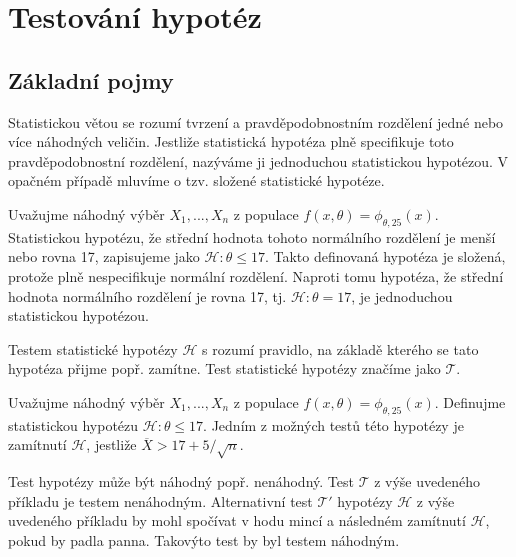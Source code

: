 \chapter{Testování hypotéz}

\section{Základní pojmy}

\begin{definition}
Statistickou větou se rozumí tvrzení a pravděpodobnostním rozdělení jedné nebo více náhodných veličin. Jestliže statistická hypotéza plně specifikuje toto pravděpodobnostní rozdělení, nazýváme ji jednoduchou statistickou hypotézou. V opačném případě mluvíme o tzv. složené statistické hypotéze.
\end{definition}

\begin{example}
Uvažujme náhodný výběr $X_1, ..., X_n$ z populace $f(x, \theta) = \phi_{\theta, 25}(x)$. Statistickou hypotézu, že střední hodnota tohoto normálního rozdělení je menší nebo rovna 17, zapisujeme jako $\mathscr{H}: \theta \le 17$. Takto definovaná hypotéza je složená, protože plně nespecifikuje normální rozdělení. Naproti tomu hypotéza, že střední hodnota normálního rozdělení je rovna 17, tj. $\mathscr{H}: \theta = 17$, je jednoduchou statistickou hypotézou.
\end{example}

\begin{definition}
Testem statistické hypotézy $\mathscr{H}$ s rozumí pravidlo, na základě kterého se tato hypotéza přijme popř. zamítne. Test statistické hypotézy značíme jako $\mathscr{T}$.
\end{definition}

\begin{example}
Uvažujme náhodný výběr $X_1, ..., X_n$ z populace $f(x, \theta) = \phi_{\theta, 25}(x)$. Definujme statistickou hypotézu $\mathscr{H}: \theta \le 17$. Jedním z možných testů této hypotézy je zamítnutí $\mathscr{H}$, jestliže $\overline{X} > 17 + 5 / \sqrt{n}$.
\end{example}

Test hypotézy může být náhodný popř. nenáhodný. Test $\mathscr{T}$ z výše uvedeného příkladu je testem nenáhodným. Alternativní test $\mathscr{T}'$ hypotézy $\mathscr{H}$ z výše uvedeného příkladu by mohl spočívat v hodu mincí a následném zamítnutí $\mathscr{H}$, pokud by padla panna. Takovýto test by byl testem náhodným.

